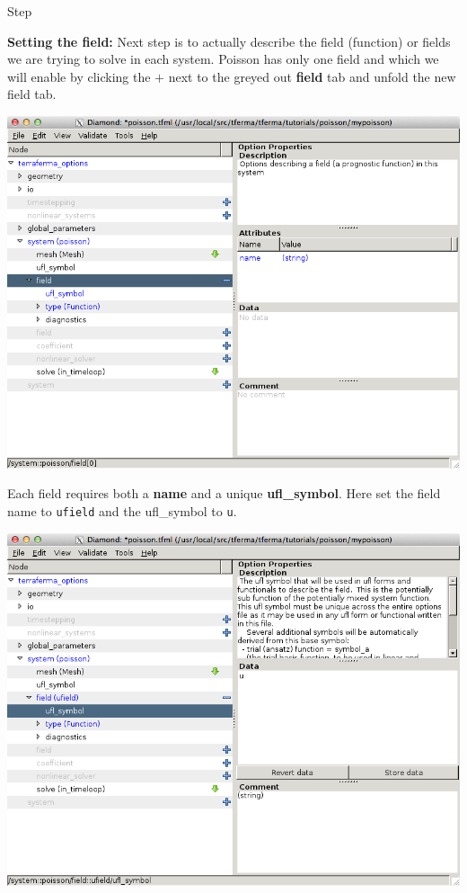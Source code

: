 \begin{steps}{Step}
\begin{center}
\end{center}
\item \textbf{Setting the field:} Next step is to actually describe
  the field (function) or fields we are trying to solve in each
  system.  Poisson has only one field and which we will enable by
  clicking the $+$ next to the greyed out \textbf{field} tab and
  unfold the new field tab.
\begin{center}
    \includegraphics[width=\diamondwidth]{figures/screendumps/diamond_poisson_06a.png}
\end{center}
Each field requires both a \textbf{name} and a unique
\textbf{ufl\_symbol}.  Here set the field name to \texttt{ufield} and
the ufl\_symbol to \texttt{u}.
\begin{center}
    \includegraphics[width=\diamondwidth]{figures/screendumps/diamond_poisson_06c.png}

\end{center}
\end{steps}
